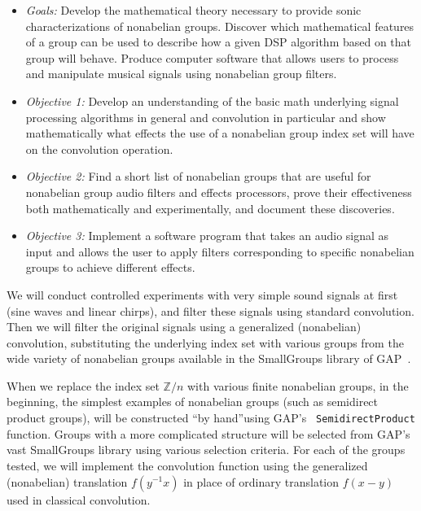 \documentclass{article}
\begin{document}
\begin{itemize}
\item {\it Goals:}
Develop the mathematical theory necessary to provide sonic characterizations of
nonabelian groups. Discover which mathematical features of a group can be used to
describe how a given \ac{DSP} algorithm based on that group will behave. 
Produce computer software that allows users to process and manipulate musical
signals using nonabelian group filters.
\item 
{\it Objective 1:} Develop an understanding of the basic math underlying signal
processing algorithms in general and convolution in particular and show
mathematically what effects the use of a nonabelian group index set will have
on the convolution operation.
\item
{\it Objective 2:} Find a short list of nonabelian groups that are useful for
nonabelian group audio filters and effects processors, prove their effectiveness
both mathematically and experimentally, and document these discoveries.
\item
{\it Objective 3:} Implement a software program that takes an audio signal as input and
allows the user to apply filters corresponding to specific nonabelian groups to
achieve different effects. 
\end{itemize}

 
\vskip5mm

We will conduct controlled experiments with very simple sound signals at first
(sine waves and linear chirps), and filter these signals using
standard convolution.  Then we will filter the original signals using a
generalized (nonabelian) convolution, substituting the underlying index set with
various groups from the wide variety of nonabelian groups available in 
the SmallGroups library of GAP~\cite{GAP4}.   

When we replace the index set $\mathbb{Z}/n$ with various finite nonabelian
groups, in the beginning, the simplest examples of nonabelian groups (such as
semidirect product groups), will be constructed ``by hand''using GAP's {\tt
  SemidirectProduct} function.  Groups with a more complicated structure will be
selected from GAP's vast SmallGroups library using various selection criteria.
For each of the groups tested, we will implement the
convolution function using the generalized (nonabelian) translation $f(y^{-1}x)$
in place of ordinary translation $f(x-y)$ used in classical convolution. 
\end{document}
